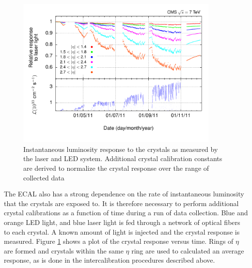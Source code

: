 \begin{figure}[h]
   \centering
  \includegraphics[width=0.9\textwidth]{Figures/Reconstruction_Diagrams/ECAL_inst_lumi_laser_calibration.pdf}
  \caption{Instantaneous luminosity response to the crystals as measured
    by the laser and LED system.  Additional crystal calibration
    constants are derived to normalize the crystal response over the
    range of collected data} \label{fig:ecal_laser}
\end{figure}

\par The ECAL also has a strong dependence on the rate of
instantaneous luminosity that the crystals are exposed to.  It is
therefore necessary to perform additional crystal calibrations as a
function of time during a run of data collection.  Blue and orange
LED light, and blue laser light is fed through a network of optical
fibers to each crystal.  A known amount of light is injected and the
crystal response is measured.  Figure \ref{fig:ecal_laser} shows a
plot of the crystal response versus time.  Rings of $\eta$ are formed
and crystals within the same $\eta$ ring are used to calculated an
average response, as is done in the intercalibration procedures
described above.   

